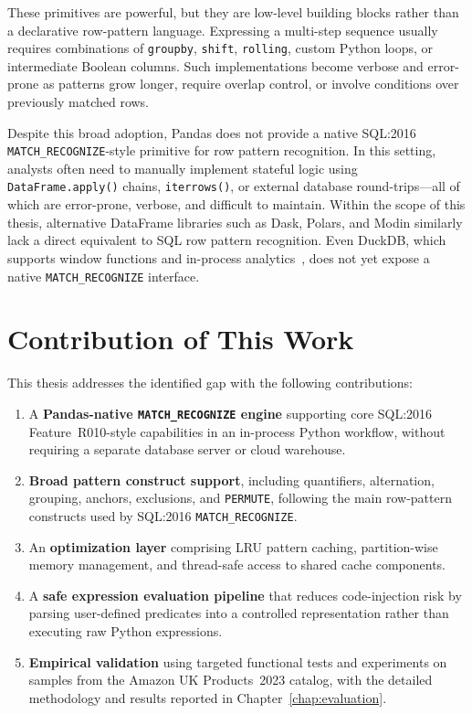 These primitives are powerful, but they are low-level building
blocks rather than a declarative row-pattern language.  Expressing a
multi-step sequence usually requires combinations of
\texttt{groupby}, \texttt{shift}, \texttt{rolling}, custom Python
loops, or intermediate Boolean columns.  Such implementations become
verbose and error-prone as patterns grow longer, require overlap
control, or involve conditions over previously matched rows.

Despite this broad adoption, Pandas does not provide
a native SQL:2016 \texttt{MATCH\_\allowbreak RECOGNIZE}-style primitive for row
pattern recognition.  In this setting, analysts often need to
manually implement stateful logic using
\texttt{DataFrame.\allowbreak apply()} chains, \texttt{iterrows()}, or external
database round-trips---all of which are error-prone, verbose, and
difficult to maintain.  Within the scope of this thesis, alternative
DataFrame libraries such as Dask, Polars, and Modin similarly lack a
direct equivalent to SQL row pattern recognition.  Even DuckDB, which
supports window functions and in-process analytics~\cite{findling2025bringing},
does not yet expose a native \texttt{MATCH\_RECOGNIZE} interface.

\section{Contribution of This Work}
\label{sec:related-contribution}

This thesis addresses the identified gap with the following
contributions:

\begin{enumerate}
  \item A \textbf{Pandas-native \texttt{MATCH\_RECOGNIZE} engine}
    supporting core SQL:2016 Feature~R010-style capabilities in an
    in-process Python workflow, without requiring a separate
    database server or cloud warehouse.
  \item \textbf{Broad pattern construct support}, including
    quantifiers, alternation, grouping, anchors, exclusions, and
    \texttt{PERMUTE}, following the main row-pattern constructs used
    by SQL:2016 \texttt{MATCH\_RECOGNIZE}.
  \item An \textbf{optimization layer} comprising
    LRU pattern caching, partition-wise memory management, and
    thread-safe access to shared cache components.
  \item A \textbf{safe expression evaluation pipeline} that
    reduces code-injection risk by parsing user-defined predicates
    into a controlled representation rather than executing raw
    Python expressions.
  \item \textbf{Empirical validation} using targeted functional
    tests and experiments on samples from the Amazon UK
    Products~2023 catalog, with the detailed methodology and
    results reported in Chapter~\ref{chap:evaluation}.
\end{enumerate}

